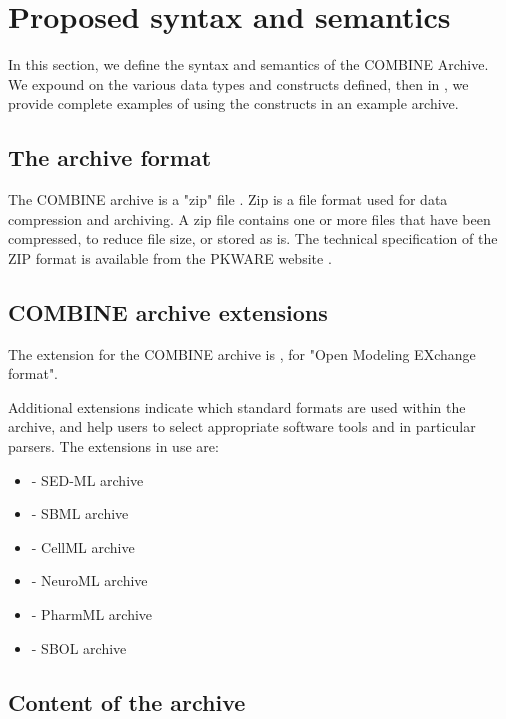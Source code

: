 
\section{Proposed syntax and semantics}
\label{syntax}

In this section, we define the syntax and semantics of the COMBINE 
Archive. We expound on the various data types and constructs defined, 
then in , we provide complete examples of using the 
constructs in an example archive. 



\subsection{The archive format}
The COMBINE archive is a "zip" file \cite{zipFile}. Zip is a file format 
used for data compression and archiving. A zip file contains one or more 
files that have been compressed, to reduce file size, or stored as is. 
The technical specification of the ZIP format is available from the 
PKWARE website \cite{zipSpec}. 


\subsection{COMBINE archive extensions}
\label{combine-archive-extensions}
The extension for the COMBINE archive is , for "{O}pen 
{M}odeling {EX}change format". 


Additional extensions indicate which standard formats are used within 
the archive, and help users to select appropriate software tools and 
in particular parsers. 
The extensions in use are: 


\begin{itemize}
	\item { - SED-ML archive} \cite{sedmll1v1}
	\item { - SBML archive} \cite{sbml}
	\item { - CellML archive} \cite{cellml11}
	\item { - NeuroML archive} \cite{Gleeson2010}
	\item { - PharmML archive} \cite{pharmml}
        \item { - SBOL archive} \cite{sbol}
\end{itemize}


\subsection{Content of the archive}

